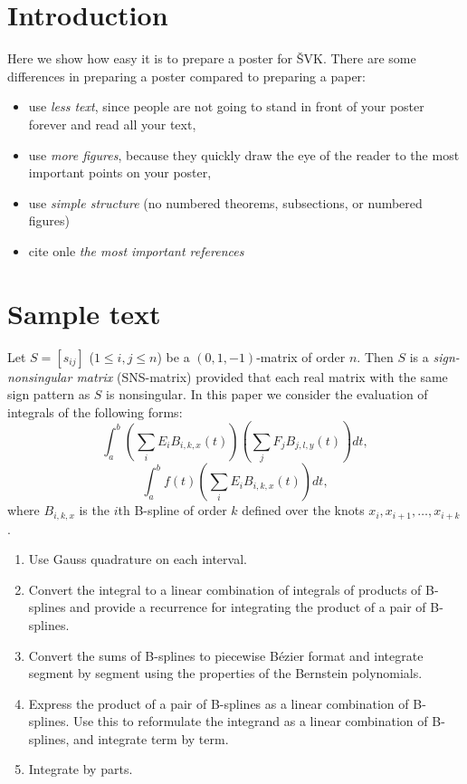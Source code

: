\documentclass[myposter,portrait]{sciposter}
\def\mysection#1{
{\color{sectionCol}\section*{\sc\bfseries #1}}}
\begin{document}
\begin{multicols*}{3}

\mysection{Introduction}
Here we show how easy it is to prepare a poster for ŠVK.
There are some differences in preparing a poster compared to
preparing a paper:

\begin{itemize}
\item use \emph{less text}, since people are not going to stand
      in front of your poster forever and read all your text,
\item use \emph{more figures}, because they quickly draw the
      eye of the reader to the most important points on your poster,
\item use \emph{simple structure} (no numbered theorems, subsections,
      or numbered figures)
\item cite onle \emph{the most important references}
\end{itemize}

\mysection{Sample text}

Let $S=[s_{ij}]$ ($1\leq i,j\leq n$) be a $(0,1,-1)$-matrix
of order $n$. Then $S$ is a {\em sign-nonsingular matrix}
(SNS-matrix) provided that each real matrix with the same
sign pattern as $S$ is nonsingular. 
In this paper we consider the evaluation of integrals of the 
following forms:
\begin{equation}
\int_a^b \left( \sum_i E_i B_{i,k,x}(t) \right)
         \left( \sum_j F_j B_{j,l,y}(t) \right) dt,\label{problem}
\end{equation}
\begin{equation}
\int_a^b f(t) \left( \sum_i E_i B_{i,k,x}(t) \right) dt,\label{problem2}
\end{equation}
where $B_{i,k,x}$ is the $i$th B-spline of order $k$ defined over the
knots $x_i, x_{i+1}, \ldots, x_{i+k}$.

\begin{enumerate}
\item Use Gauss quadrature on each interval.
\item Convert the integral to a linear combination of
      integrals of products of B-splines and provide a recurrence for
      integrating the product of a pair of B-splines.
\item Convert the sums of B-splines to piecewise
      B\'{e}zier format and integrate segment
      by segment using the properties of the Bernstein polynomials.
\item Express the product of a pair of B-splines as a linear combination
      of B-splines.
      Use this to reformulate the integrand as a linear combination
      of B-splines, and integrate term by term.
\item Integrate by parts.
\end{enumerate}


\end{multicols*}
\end{document}
